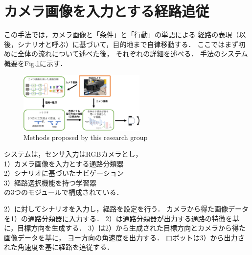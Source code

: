 \documentclass{sice-si}
\begin{document}
\section{カメラ画像を入力とする経路追従}
この手法では，カメラ画像と「条件」と「行動」の単語による
経路の表現（以後，シナリオと呼ぶ）に基づいて，目的地まで自律移動する．
ここではまず初めに全体の流れについて述べた後，
それぞれの詳細を述べる．
手法のシステム概要をFig.\ref{fig:system}に示す．
\begin{figure}[h!]
    \centering
     \includegraphics[height=30mm]{./figs/system.png}
     \caption{Methods proposed by this research group}\label{fig:system}
\end{figure}
\par
システムは，センサ入力はRGBカメラとし，\\
1）カメラ画像を入力とする通路分類器\\
2）シナリオに基づいたナビゲーション\\
3）経路選択機能を持つ学習器\\
の3つのモジュールで構成されている．

2）に対してシナリオを入力し，経路を設定を行う．
カメラから得た画像データを1）の通路分類器に入力する．
2）は通路分類器が出力する通路の特徴を基に，目標方向を生成する．
3）は2）から生成された目標方向とカメラから得た画像データを基に，
ヨー方向の角速度を出力する．
ロボットは3）から出力された角速度を基に経路を追従する．
\end{document}
